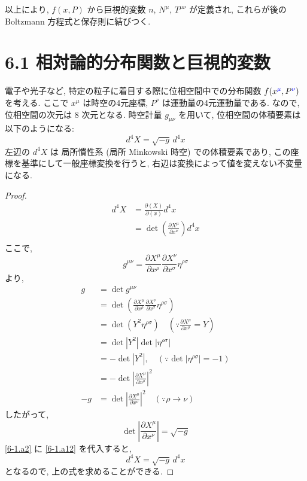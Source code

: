 \documentclass[a4paper,12pt]{article}
\begin{document}
\noindent
以上により, $f(x,P)$ から巨視的変数 $n$, $N^\mu$, $T^{\mu\nu}$ が定義され, これらが後の Boltzmann 方程式と保存則に結びつく.

\newpage
\color{black}
\section*{6.1 相対論的分布関数と巨視的変数}
電子や光子など, 特定の粒子に着目する際に位相空間中での分布関数 $f(x^{\textcolor{blue}{\mu}},P^{\textcolor{blue}{\nu}})$ を考える. ここで $x^\mu$ は時空の4元座標, $P^\nu$ は運動量の4元運動量である. なので, 位相空間の次元は 8 次元となる. 時空計量 $g_{\mu\nu}$ を用いて, 位相空間の体積要素は以下のようになる:
\begin{equation*}
  d^4 X = \sqrt{-g}\, d^4 x
\end{equation*}
\color{blue}
左辺の $d^4 X$ は 局所慣性系 (局所 Minkowski 時空) での体積要素であり, この座標を基準にして一般座標変換を行うと, 右辺は変換によって値を変えない不変量になる.
\begin{proof}
\begin{align*}
  d^4 X &= \frac{\partial (X)}{\partial (x)} d^4 x \tag{6-1.a1} \\
  &= \det \left( \frac{\partial X^\mu}{\partial x^\nu} \right) d^4 x \label{6-1.a2}\tag{6-1.a2} \\
\end{align*}
ここで,
\begin{equation*}
    g^{\mu\nu} = \frac{\partial X^\mu}{\partial x^\rho} \frac{\partial X^\nu}{\partial x^\sigma} \eta^{\rho\sigma} \tag{6-1.a3}
\end{equation*}
より,
\begin{align*}
    g &= \det g^{\mu\nu} \tag{6-1.a4} \\
    &= \det \left( \frac{\partial X^\mu}{\partial x^\rho} \frac{\partial X^\nu}{\partial x^\sigma} \eta^{\rho\sigma} \right) \tag{6-1.a5} \\
    &= \det \left( Y^2 \eta^{\rho\sigma} \right) \quad \left( \because  \frac{\partial X^\mu}{\partial x^\rho} = Y \right) \tag{6-1.a6} \\
    &= \det \left| Y^2 \right| \det |\eta^{\rho\sigma}| \tag{6-1.a7} \\
    &= - \det \left| Y^2 \right|, \quad (\because \det |\eta^{\rho\sigma}| = -1) \tag{6-1.a8} \\
    &= - \det \left| \frac{\partial X^\mu}{\partial x^\rho} \right|^2 \tag{6-1.a9}\\
    -g &= \det \left| \frac{\partial X^\mu}{\partial x^\nu} \right|^2 \quad (\because \rho \to \nu) \tag{6-1.a11}
\end{align*}
したがって,
\begin{equation*}
    \det \left| \frac{\partial X^\mu}{\partial x^\nu} \right| = \sqrt{-g} \label{6-1.a12}\tag{6-1.a12}
\end{equation*}
\eqref{6-1.a2} に \eqref{6-1.a12} を代入すると,
\begin{equation*}
    d^4 X = \sqrt{-g}\, d^4 x \tag{6-1.a13}
\end{equation*}
となるので, 上の式を求めることができる.
\end{proof}
\end{document}
